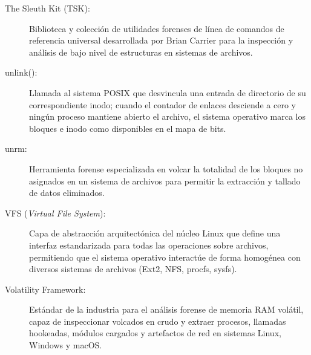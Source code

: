 \begin{description}
    \item[The Sleuth Kit (TSK):] Biblioteca y colección de utilidades forenses de línea de comandos de referencia universal desarrollada por Brian Carrier para la inspección y análisis de bajo nivel de estructuras en sistemas de archivos.

    \item[unlink():] Llamada al sistema POSIX que desvincula una entrada de directorio de su correspondiente inodo; cuando el contador de enlaces desciende a cero y ningún proceso mantiene abierto el archivo, el sistema operativo marca los bloques e inodo como disponibles en el mapa de bits.

    \item[unrm:] Herramienta forense especializada en volcar la totalidad de los bloques no asignados en un sistema de archivos para permitir la extracción y tallado de datos eliminados.

    \item[VFS (\textit{Virtual File System}):] Capa de abstracción arquitectónica del núcleo Linux que define una interfaz estandarizada para todas las operaciones sobre archivos, permitiendo que el sistema operativo interactúe de forma homogénea con diversos sistemas de archivos (Ext2, NFS, procfs, sysfs).

    \item[Volatility Framework:] Estándar de la industria para el análisis forense de memoria RAM volátil, capaz de inspeccionar volcados en crudo y extraer procesos, llamadas hookeadas, módulos cargados y artefactos de red en sistemas Linux, Windows y macOS.
\end{description}
